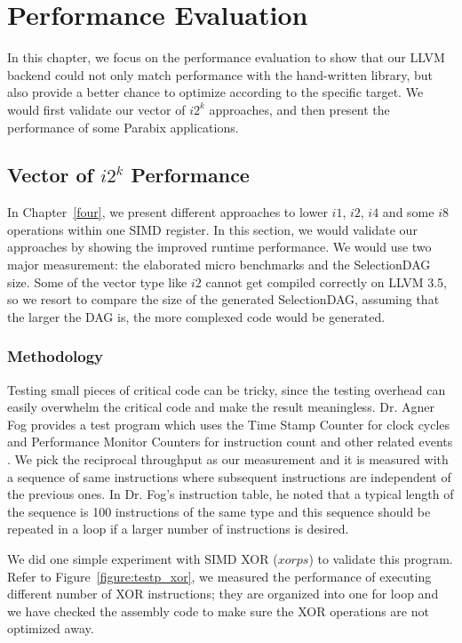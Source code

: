 %
%

\chapter{Performance Evaluation}
\label{six}

In this chapter, we focus on the performance evaluation to show that our LLVM backend could not only match performance with the hand-written library, but also provide a better chance to optimize according to the specific target. We would first validate our vector of $i2^k$ approaches, and then present the performance of some Parabix applications.

\section{Vector of $i2^k$ Performance}
In Chapter~\ref{four}, we present different approaches to lower $i1$, $i2$, $i4$ and some $i8$ operations within one SIMD register. In this section, we would validate our approaches by showing the improved runtime performance. We would use two major measurement: the elaborated micro benchmarks and the SelectionDAG size. Some of the vector type like $i2$ cannot get compiled correctly on LLVM 3.5, so we resort to compare the size of the generated SelectionDAG, assuming that the larger the DAG is, the more complexed code would be generated.

\subsection{Methodology}

Testing small pieces of critical code can be tricky, since the testing overhead can easily overwhelm the critical code and make the result meaningless. Dr. Agner Fog provides a test program which uses the Time Stamp Counter for clock cycles and Performance Monitor Counters for instruction count and other related events \cite{agner_testp}. We pick the reciprocal throughput as our measurement and it is measured with a sequence of same instructions where subsequent instructions are independent of the previous ones. In Dr. Fog's instruction table, he noted that a typical length of the sequence is 100 instructions of the same type and this sequence should be repeated in a loop if a larger number of instructions is desired.

We did one simple experiment with SIMD XOR ($xorps$) to validate this program. Refer to Figure~\ref{figure:testp_xor}, we measured the performance of executing different number of XOR instructions; they are organized into one for loop and we have checked the assembly code to make sure the XOR operations are not optimized away.

